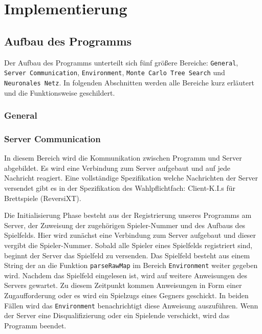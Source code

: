\documentclass[12pt,a4paper]{article}
\begin{document}
\newpage
\section{Implementierung}

\subsection{Aufbau des Programms}
Der Aufbau des Programms unterteilt sich fünf größere Bereiche: \texttt{General}, \texttt{Server Communication}, \texttt{Environment}, \texttt{Monte Carlo Tree Search} und \texttt{Neuronales Netz}. In folgenden Abschnitten werden alle Bereiche kurz erläutert und die Funktionsweise geschildert.

\subsubsection{General}

\subsubsection{Server Communication}
In diesem Bereich wird die Kommunikation zwischen Programm und Server abgebildet. Es wird eine Verbindung zum Server aufgebaut und auf jede Nachricht reagiert. Eine vollständige Spezifikation welche Nachrichten der Server versendet gibt es in der Spezifikation des Wahlpflichtfach: Client-K.I.s für Brettspiele (ReversiXT).

Die Initialisierung Phase besteht aus der Registrierung unseres Programms am Server, der Zuweisung der zugehörigen Spieler-Nummer und des Aufbaus des Spielfelds. Hier wird zunächst eine Verbindung zum Server aufgebaut und dieser vergibt die Spieler-Nummer. Sobald alle Spieler eines Spielfelds registriert sind, beginnt der Server das Spielfeld zu versenden. Das Spielfeld besteht aus einem String der an die Funktion \texttt{parseRawMap} im Bereich \texttt{Environment} weiter gegeben wird. Nachdem das Spielfeld eingelesen ist, wird auf weitere Anweisungen des Servers gewartet. Zu diesem Zeitpunkt kommen Anweisungen in Form einer Zugaufforderung oder es wird ein Spielzugs eines Gegners geschickt. In beiden Fällen wird das \texttt{Environment} benachrichtigt diese Anweisung auszuführen. Wenn der Server eine Disqualifizierung oder ein Spielende verschickt, wird das Programm beendet.
\end{document}
